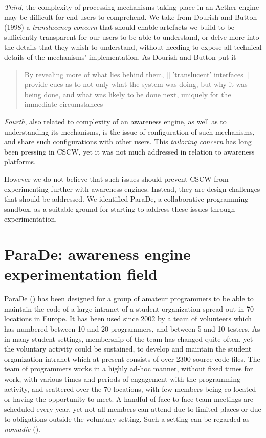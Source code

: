 \documentclass{ecscw2007}
\begin{document}
\textit{Third}, the complexity of processing mechanisms taking place in an Aether engine may be difficult for end users to comprehend. We take from Dourish and Button (1998) a \textit{translucency concern} that should enable artefacts we build to be sufficiently transparent for our users to be able to understand, or delve more into the details that they whish to understand, without needing to expose all technical details of the mechanisms' implementation. As Dourish and Button put it
\begin{quote}By revealing more of what lies behind them, [] 'translucent' interfaces [] provide cues as to not only what the system was doing, but why it was being done, and what was likely to be done next, uniquely for the immediate circumstances
\end{quote}

\textit{Fourth}, also related to complexity of an awareness engine, as well as to understanding its mechanisms, is the issue of configuration of such mechanisms, and share such configurations with other users. This \textit{tailoring concern} has long been pressing in CSCW, yet it was not much addressed in relation to awareness platforms.

However we do not believe that such issues should prevent CSCW from experimenting further with awareness engines. Instead, they are design challenges that should be addressed. We identified ParaDe, a collaborative programming sandbox, as a suitable ground for starting to address these issues through experimentation. 

\section*{ParaDe: awareness engine experimentation field} 
ParaDe (\cite{bogdan-coop08}) has been designed for a group of amateur programmers to be able to maintain the code of a large intranet of a student organization spread out in 70 locations in Europe. It has been used since 2002 by a team of volunteers which has numbered between 10 and 20 programmers, and between 5 and 10 testers. As in many student settings, membership of the team has changed quite often, yet the voluntary activity could be sustained, to develop and maintain the student organization intranet which at present consists of over 2300 source code files. The team of programmers works in a highly ad-hoc manner, without fixed times for work, with various times and  periods of engagement with the programming activity, and scattered over the 70 locations, with few members being co-located or having the opportunity to meet. A handful of face-to-face team meetings are scheduled every year, yet not all members can attend due to limited places or due to obligations outside the voluntary setting. Such a setting can be regarded as \textit{nomadic} (\cite{bogdan-coop06}).
\end{document}

